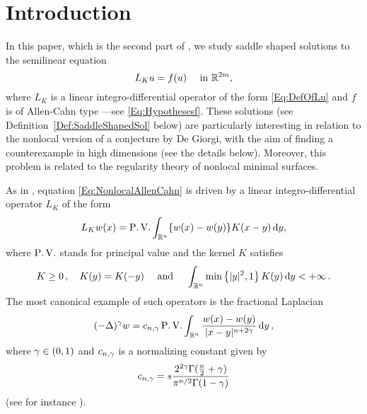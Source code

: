 \section{Introduction}
\label{Sec:Introduction}

In this paper, which is the second part of \cite{FelipeSanz-Perela:IntegroDifferentialI}, we study saddle shaped solutions to the semilinear equation
\begin{equation}
\label{Eq:NonlocalAllenCahn}
L_K u = f(u) \quad \textrm{ in } \mathbb{R}^{2m},
\end{equation}
where $L_K$ is a linear integro-differential operator of the form \eqref{Eq:DefOfLu} and $f$ is of Allen-Cahn type ---see \eqref{Eq:Hypothesesf}. These  solutions (see Definition~\ref{Def:SaddleShapedSol} below) are particularly interesting in relation to the nonlocal version of a conjecture by De Giorgi, with the aim of finding a counterexample in high dimensions (see the details below). Moreover, this problem is related to the regularity theory of nonlocal minimal surfaces.

As in \cite{FelipeSanz-Perela:IntegroDifferentialI}, equation \eqref{Eq:NonlocalAllenCahn} is driven by a linear integro-differential operator $L_K$ of the form
\begin{equation}
\label{Eq:DefOfLu}
L_K w(x) = \operatorname{P.V.} \int_{\mathbb{R}^n} \{w(x) - w(y)\} K(x-y)\,\mathrm{d} y,
\end{equation}
where $\operatorname{P.V.}$ stands for principal value and the kernel $K$ satisfies
\begin{equation}
\label{Eq:Symmetry&IntegrabilityOfK}
K\geq 0\,, \quad K(y) = K(-y) \quad \textrm{ and } \quad \int_{\mathbb{R}^n} \min \left\{ |y|^2, 1 \right\} K(y) \,\mathrm{d} y < + \infty\,.
\end{equation}
The most canonical example of such operators is the fractional Laplacian
$$
(-\Delta)^\gamma w = c_{n, \gamma} \operatorname{P.V.} \int_{\mathbb{R}^n} \dfrac{w(x) - w(y)}{|x-y|^{n + 2\gamma}}\,\mathrm{d} y\,,
$$
where $\gamma \in (0,1)$ and $c_{n, \gamma}$ is a normalizing constant given by
\begin{equation}
	\label{Eq:ConstantFracLaplacian}
	c_{n,\gamma} = s\dfrac{2^{2\gamma} \Gamma(\frac{n}{2}+\gamma) }{\pi^{n/2} \Gamma(1-\gamma)}
\end{equation}
(see for instance \cite{BucurValdinoci}).

